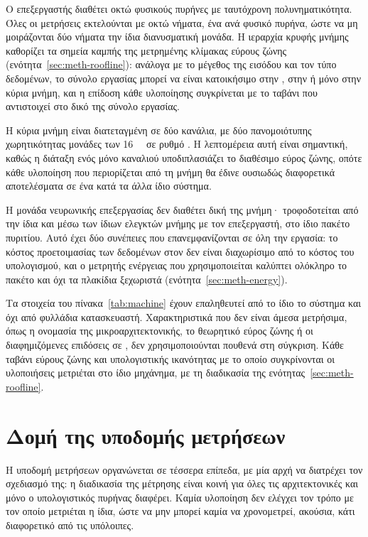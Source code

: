 Ο επεξεργαστής διαθέτει οκτώ φυσικούς πυρήνες με ταυτόχρονη πολυνηματικότητα.
Όλες οι μετρήσεις εκτελούνται με οκτώ νήματα, ένα ανά φυσικό πυρήνα, ώστε να μη
μοιράζονται δύο νήματα την ίδια διανυσματική μονάδα. Η ιεραρχία κρυφής μνήμης
καθορίζει τα σημεία καμπής της μετρημένης κλίμακας εύρους ζώνης
(ενότητα~\ref{sec:meth-roofline}): ανάλογα με το μέγεθος της εισόδου και τον
τύπο δεδομένων, το σύνολο εργασίας μπορεί να είναι κατοικήσιμο στην ,
στην  ή μόνο στην κύρια μνήμη, και η επίδοση κάθε υλοποίησης συγκρίνεται
με το ταβάνι που αντιστοιχεί στο δικό της σύνολο εργασίας.

Η κύρια μνήμη είναι διατεταγμένη σε δύο κανάλια, με δύο πανομοιότυπης
χωρητικότητας μονάδες των \qty{16}{\gibi\byte} σε ρυθμό . Η
λεπτομέρεια αυτή είναι σημαντική, καθώς η διάταξη ενός μόνο καναλιού υποδιπλασιάζει
το διαθέσιμο εύρος ζώνης, οπότε κάθε υλοποίηση που περιορίζεται από τη μνήμη θα
έδινε ουσιωδώς διαφορετικά αποτελέσματα σε ένα κατά τα άλλα ίδιο σύστημα.

Η μονάδα νευρωνικής επεξεργασίας δεν διαθέτει δική της μνήμη· τροφοδοτείται από
την ίδια  και μέσω των ίδιων ελεγκτών μνήμης με τον επεξεργαστή, στο
ίδιο πακέτο πυριτίου. Αυτό έχει δύο συνέπειες που επανεμφανίζονται σε όλη την
εργασία: το κόστος προετοιμασίας των δεδομένων στον  δεν είναι
διαχωρίσιμο από το κόστος του υπολογισμού, και ο μετρητής ενέργειας που
χρησιμοποιείται καλύπτει ολόκληρο το πακέτο και όχι τα πλακίδια 
ξεχωριστά (ενότητα~\ref{sec:meth-energy}).

Τα στοιχεία του πίνακα~\ref{tab:machine} έχουν επαληθευτεί από το ίδιο το
σύστημα και όχι από φυλλάδια κατασκευαστή. Χαρακτηριστικά που δεν είναι άμεσα
μετρήσιμα, όπως η ονομασία της μικροαρχιτεκτονικής, το θεωρητικό εύρος ζώνης ή
οι διαφημιζόμενες επιδόσεις σε , δεν χρησιμοποιούνται πουθενά στη
σύγκριση. Κάθε ταβάνι εύρους ζώνης και υπολογιστικής ικανότητας με το οποίο
συγκρίνονται οι υλοποιήσεις μετριέται στο ίδιο μηχάνημα, με τη διαδικασία της
ενότητας~\ref{sec:meth-roofline}.

\section{Δομή της υποδομής μετρήσεων}
\label{sec:meth-harness}

Η υποδομή μετρήσεων οργανώνεται σε τέσσερα επίπεδα, με μία αρχή να διατρέχει
τον σχεδιασμό της: η διαδικασία της μέτρησης είναι κοινή για όλες τις
αρχιτεκτονικές και μόνο ο υπολογιστικός πυρήνας διαφέρει. Καμία υλοποίηση δεν
ελέγχει τον τρόπο με τον οποίο μετριέται η ίδια, ώστε να μην μπορεί καμία να
χρονομετρεί, ακούσια, κάτι διαφορετικό από τις υπόλοιπες.

